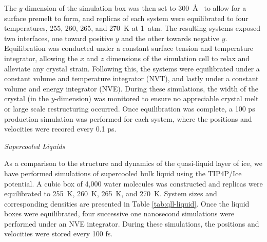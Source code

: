The $y$-dimension of the simulation box was then set to 300~\AA~ to
allow for a surface premelt to form, and replicas of each system were
equilibrated to four temperatures, 255, 260, 265, and 270~K at
1~atm. The resulting systems exposed two interfaces, one toward
positive $y$ and the other towards negative $y$. Equilibration was
conducted under a constant surface tension and temperature integrator,
allowing the $x$ and $z$ dimensions of the simulation cell to relax
and alleviate any crystal strain. Following this, the systems were
equilibrated under a constant volume and temperature integrator (NVT),
and lastly under a constant volume and energy integrator (NVE). During
these simulations, the width of the crystal (in the $y$-dimension) was
monitored to ensure no appreciable crystal melt or large scale
restructuring occurred. Once equilibration was complete, a 100 ps
production simulation was performed for each system, where the
positions and velocities were recored every 0.1 ps.





\begin{flushleft}
\textit{Supercooled Liquids}
\end{flushleft}
As a comparison to the structure and dynamics of the quasi-liquid
layer of ice, we have performed simulations of supercooled bulk liquid using the
TIP4P/Ice potential. A cubic box of 4,000 water molecules was
constructed and replicas were equilibrated to 255~K, 260~K, 265~K, and
270~K. System sizes and corresponding densities are presented in Table
\ref{tab:qll-liquid}. Once the liquid boxes were equilibrated, four
successive one nanosecond simulations were performed under an NVE
integrator. During these simulations, the positions and velocities
were stored every 100 fs.

